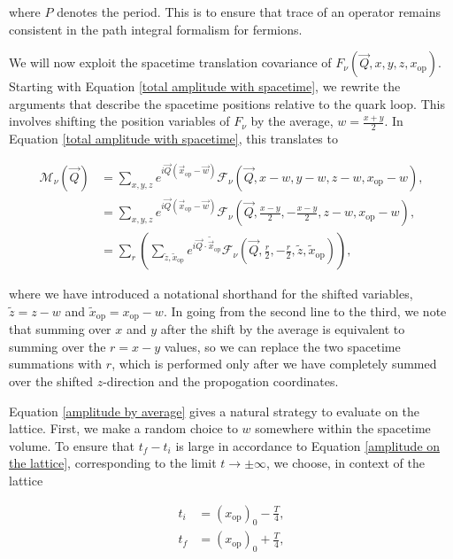 \documentclass{article}
\numberwithin{equation}{section} %
\begin{document}
\noindent where $P$ denotes the period. This is to ensure that trace of an operator remains consistent in the path integral formalism for fermions\cite{antiperiodic}. 

We will now exploit the spacetime translation covariance of $F_\nu(\vec{Q},x,y,z,x_\mathrm{op})$. Starting with Equation \ref{total amplitude with spacetime}, we rewrite the arguments that describe the spacetime positions relative to the quark loop. This involves shifting the position variables of $F_\nu$ by the average, $w=\frac{x+y}{2}$. In Equation \ref{total amplitude with spacetime}, this translates to

\begin{equation}
\begin{split}
\mathcal{M}_\nu(\vec{Q}) &= \sum_{x,y,z} e^{i\vec{Q}(\vec{x}_\mathrm{op}-\vec{w})} \mathcal{F}_\nu(\vec{Q},x-w,y-w,z-w,x_\mathrm{op}-w), \\
&= \sum_{x,y,z} e^{i\vec{Q}(\vec{x}_\mathrm{op}-\vec{w})} \mathcal{F}_\nu(\vec{Q},\frac{x-y}{2},-\frac{x-y}{2},z-w,x_\mathrm{op}-w),\\
&= \sum_r\left(\sum_{\tilde{z},\tilde{x}_\mathrm{op}} e^{i\vec{Q}\cdot\tilde{\vec{x}}_\mathrm{op}} \mathcal{F}_\nu(\vec{Q},\frac{r}{2},-\frac{r}{2},\tilde{z},\tilde{x}_\mathrm{op})\right),
\end{split}
\label{amplitude by average}
\end{equation}


\noindent where we have introduced a notational shorthand for the shifted variables, $\tilde{z}=z-w$ and $\tilde{x}_\mathrm{op}=x_\mathrm{op}-w$. In going from the second line to the third, we note that summing over $x$ and $y$ after the shift by the average is equivalent to summing over the $r=x-y$ values, so we can replace the two spacetime summations with $r$, which is performed only after we have completely summed over the shifted $z$-direction and the propogation coordinates.

Equation \ref{amplitude by average} gives a natural strategy to evaluate on the lattice. First, we make a random choice to $w$ somewhere within the spacetime volume. To ensure that $t_f-t_i$ is large in accordance to Equation \ref{amplitude on the lattice}, corresponding to the limit $t\rightarrow \pm \infty$, we choose, in context of the lattice

\begin{equation}
\begin{split}
t_i &= (x_\mathrm{op})_0 -\frac{T}{4},\\
t_f &= (x_\mathrm{op})_0 +\frac{T}{4},
\end{split}
\end{equation}
\end{document}
